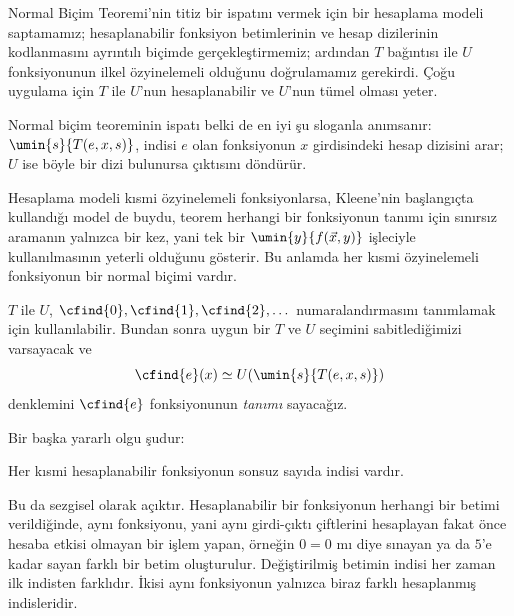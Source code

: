 \begin{explain}
Normal Biçim Teoremi'nin titiz bir ispatını vermek için bir hesaplama modeli
saptamamız; hesaplanabilir fonksiyon betimlerinin ve hesap dizilerinin
kodlanmasını ayrıntılı biçimde gerçekleştirmemiz; ardından $T$ bağıntısı ile
$U$ fonksiyonunun ilkel özyinelemeli olduğunu doğrulamamız gerekirdi. Çoğu
uygulama için $T$ ile $U$'nun hesaplanabilir ve $U$'nun tümel olması yeter.

Normal biçim teoreminin ispatı belki de en iyi şu sloganla anımsanır:
$\umin{s}{T(e,x,s)}$, indisi $e$ olan fonksiyonun $x$ girdisindeki hesap
dizisini arar; $U$ ise böyle bir dizi bulunursa çıktısını döndürür.
\end{explain}

Hesaplama modeli kısmi özyinelemeli fonksiyonlarsa, Kleene'nin başlangıçta
kullandığı model de buydu, teorem herhangi bir fonksiyonun tanımı için
sınırsız aramanın yalnızca bir kez, yani tek bir
$\umin{y}{f(\vec x,y)}$ işleciyle kullanılmasının yeterli olduğunu gösterir.
Bu anlamda her kısmi özyinelemeli fonksiyonun bir normal biçimi vardır.

$T$ ile $U$, $\cfind{0},\cfind{1},\cfind{2},\dots$ numaralandırmasını
tanımlamak için kullanılabilir. Bundan sonra uygun bir $T$ ve $U$ seçimini
sabitlediğimizi varsayacak ve
\[
  \cfind{e}(x)\simeq U(\umin{s}{T(e,x,s)})
\]
denklemini $\cfind{e}$ fonksiyonunun \emph{tanımı} sayacağız.

Bir başka yararlı olgu şudur:

\begin{thm}
Her kısmi hesaplanabilir fonksiyonun sonsuz sayıda indisi vardır.
\end{thm}

Bu da sezgisel olarak açıktır. Hesaplanabilir bir fonksiyonun herhangi bir
betimi verildiğinde, aynı fonksiyonu, yani aynı girdi-çıktı çiftlerini
hesaplayan fakat önce hesaba etkisi olmayan bir işlem yapan, örneğin
$0=0$ mı diye sınayan ya da $5$'e kadar sayan farklı bir betim oluşturulur.
Değiştirilmiş betimin indisi her zaman ilk indisten farklıdır. İkisi aynı
fonksiyonun yalnızca biraz farklı hesaplanmış indisleridir.

